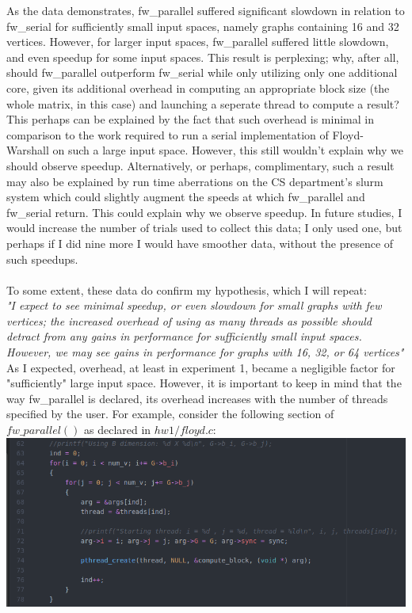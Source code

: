 \documentclass[]{article}
\begin{document}
	 
	As the data demonstrates, fw\_parallel suffered significant slowdown in relation to fw\_serial for sufficiently small input spaces, namely graphs containing 16 and 32 vertices. However, for larger input spaces, fw\_parallel suffered little slowdown, and even speedup for some input spaces. This result is perplexing; why, after all, should fw\_parallel outperform fw\_serial while only utilizing only one additional core, given its additional overhead in computing an appropriate block size (the whole matrix, in this case) and launching a seperate thread to compute a result? This perhaps can be explained by the fact that such overhead is minimal in comparison to the work required to run a serial implementation of Floyd-Warshall on such a large input space. However, this still wouldn't explain why we should observe speedup. Alternatively, or perhaps, complimentary, such a result may also be explained by run time aberrations on the CS department's slurm system which could slightly augment the speeds at which fw\_parallel and fw\_serial return. This could explain why we observe speedup. In future studies, I would increase the number of trials used to collect this data; I only used one, but perhaps if I did nine more I would have smoother data, without the presence of such speedups.
	\\\\
	To some extent, these data do confirm my hypothesis, which I will repeat:
	\\
	\textit{"I expect to see minimal speedup, or even slowdown for small graphs with few vertices; the increased overhead of using as many threads as possible should detract from any gains in performance for sufficiently small input spaces. However, we may see gains in performance for graphs with 16, 32, or 64 vertices"}
	\\
	As I expected, overhead, at least in experiment 1, became a negligible factor for "sufficiently" large input space. However, it is important to keep in mind that the way fw\_parallel is declared, its overhead increases with the number of threads specified by the user. For example, consider the following section of $fw\_parallel()$ as declared in $hw1/floyd.c$:
	\\
			\includegraphics[scale=0.5]{code/ex1.png}
\end{document}
